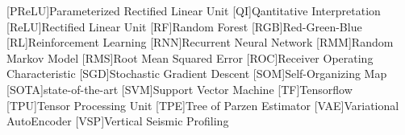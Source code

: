 \begin{acronym}[DCGANS]
[PReLU]{Parameterized Rectified Linear Unit}
[QI]{Qantitative Interpretation}
[ReLU]{Rectified Linear Unit}
[RF]{Random Forest}
[RGB]{Red-Green-Blue}
[RL]{Reinforcement Learning}
[RNN]{Recurrent Neural Network}
[RMM]{Random Markov Model}
[RMS]{Root Mean Squared Error}
[ROC]{Receiver Operating Characteristic}
[SGD]{Stochastic Gradient Descent}
[SOM]{Self-Organizing Map}
[SOTA]{state-of-the-art}
[SVM]{Support Vector Machine}
[TF]{Tensorflow}
[TPU]{Tensor Processing Unit}
[TPE]{Tree of Parzen Estimator}
[VAE]{Variational AutoEncoder}
[VSP]{Vertical Seismic Profiling}
\end{acronym}

